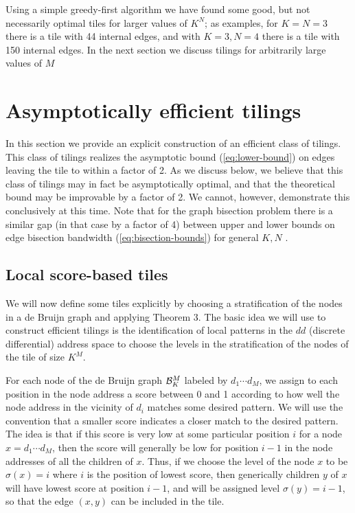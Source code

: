 \documentclass[12pt]{article}
\begin{document}
Using a simple greedy-first algorithm we have found some good, but not
necessarily optimal tiles for larger values of $K^N$; as examples, for
$K = N = 3$ there is a tile with 44 internal edges, and with $K = 3, N
= 4$ there is a tile with  150 internal edges.  In the next section we
discuss tilings for arbitrarily large values of $M$


\section{Asymptotically efficient tilings}
\label{sec:efficient}

In this section we provide an explicit construction of an efficient
class of tilings.  This class of tilings realizes the asymptotic bound
(\ref{eq:lower-bound}) on edges leaving the tile to within a factor of
2.  As we discuss below, we believe that this class of tilings may in
fact be asymptotically optimal, and that the theoretical bound may be
improvable by a factor of 2.  We cannot, however, demonstrate this
conclusively at this time.  Note that for the graph bisection problem
there is a similar gap (in that case by a factor of 4) between upper
and lower bounds on edge bisection bandwidth
(\ref{eq:bisection-bounds}) for general $K, N$ \cite{rttv}.


\subsection{Local score-based tiles}
\label{sec:score-tiles}

We will now define some tiles explicitly by choosing a stratification
of the nodes in a de Bruijn graph and applying Theorem 3.
The basic idea we will use to construct efficient tilings is the
identification of local patterns in the $dd$ (discrete differential)
address space to choose the levels in the stratification of the nodes
of the tile of size $K^M$.

For each node of the de Bruijn graph
${\cal B}_K^M$ labeled by $d_1 \cdots d_M$, we
assign to each position in the node address a score between 0 and 1
according to how well the node address in the vicinity of $d_i$
matches some desired pattern.  We will use the convention that a
smaller score indicates a closer match to the desired pattern.  The
idea is that if this score is very low at some particular position
$i$ for a node $x=d_1 \cdots d_M$, then the score will generally be
low for position $i -1$ in the node addresses of all the children of
$x$.  Thus, if we choose the level of the node $x$ to be $\sigma (x)
=i$
where $i$ is the position of lowest score, then generically children
$y$ of $x$ will have lowest score at position $i-1$, and will be
assigned level $\sigma (y) = i -1$, so that the edge $(x, y)$ can
be included in the tile.
\end{document}
